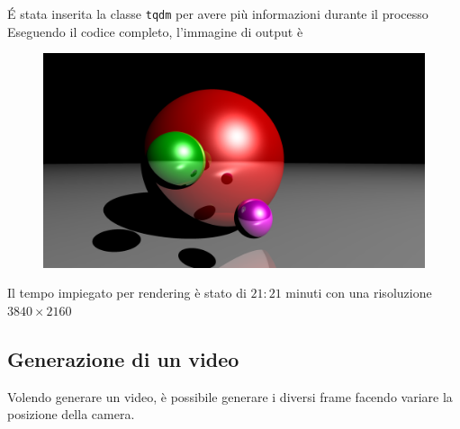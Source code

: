 \documentclass[9pt,a4paper,twoside]{tau}
\begin{document}
\'E stata inserita la classe \texttt{tqdm} per avere più informazioni durante il processo
Eseguendo il codice completo, l'immagine di output è 
\begin{figure}[H]
    \centering
    \includegraphics[width=0.7\columnwidth]{Figures/22.png}
    \caption{}
    \label{fig:figure}
\end{figure}
Il tempo impiegato per rendering è stato di $21:21$ minuti con una risoluzione $3840\times 2160$

\subsection{Generazione di un video}
Volendo generare un video, è possibile generare i diversi frame facendo variare la posizione della camera. 

					

\nocite{*}
\printbibliography

\end{document}
